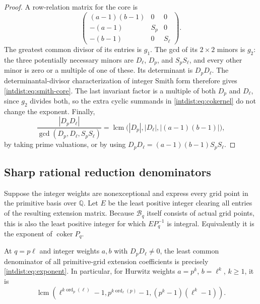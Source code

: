 \begin{proof}
A row-relation matrix for the core is
\[
 \begin{pmatrix}
 (a-1)(b-1)&0&0\\
 -(a-1)&S_p&0\\
 -(b-1)&0&S_\ell
 \end{pmatrix}.
\]
The greatest common divisor of its entries is $g_1$. The gcd of its
$2\times2$ minors is $g_2$: the three potentially necessary minors
are $D_\ell$, $D_p$, and $S_pS_\ell$, and every other minor is zero or
a multiple of one of these. Its determinant is $D_pD_\ell$.
The determinantal-divisor characterization of integer Smith form
therefore gives \eqref{intdist:eq:smith-core}.
The last invariant factor is a multiple of both $D_p$ and $D_\ell$,
since $g_2$ divides both, so the extra cyclic summands in
\eqref{intdist:eq:cokernel} do not change the exponent. Finally,
\[
 \frac{|D_pD_\ell|}{\gcd(D_p,D_\ell,S_pS_\ell)}
 =\operatorname{lcm}\bigl(|D_p|,|D_\ell|,|(a-1)(b-1)|\bigr),
\]
by taking prime valuations, or by using
$D_pD_\ell=(a-1)(b-1)S_pS_\ell$.
\end{proof}

\subsection{Sharp rational reduction denominators}

Suppose the integer weights are nonexceptional and express every grid
point in the primitive basis over $\mathbb Q$. Let $E$ be the least
positive integer clearing all entries of the resulting extension
matrix. Because $\mathcal B_q$ itself consists of actual grid points,
this is also the least positive integer for which
$E P_q^{-1}$ is integral. Equivalently it is the exponent of
$\operatorname{coker}P_q$.

\begin{corollary}
\label{intdist:cor:denominator}
At $q=p\ell$ and integer weights $a,b$ with $D_pD_\ell\ne0$, the
least common denominator of all primitive-grid extension coefficients
is precisely \eqref{intdist:eq:exponent}. In particular, for Hurwitz
weights $a=p^k$, $b=\ell^k$, $k\ge1$, it is
\begin{equation}\label{intdist:eq:hurwitz-denominator}
 \operatorname{lcm}\left(
 \ell^{k\operatorname{ord}_p(\ell)}-1,
 p^{k\operatorname{ord}_\ell(p)}-1,
 (p^k-1)(\ell^k-1)\right).
\end{equation}
\end{corollary}

